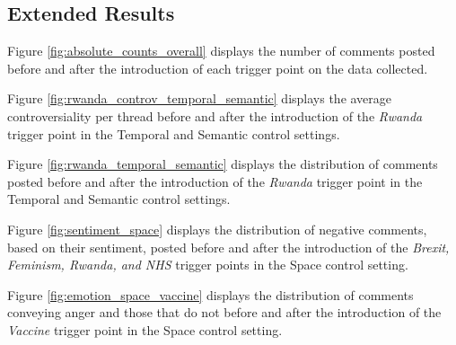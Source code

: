 \subsection{Extended Results}
\label{sec:appendix_counts}

Figure \ref{fig:absolute_counts_overall} displays the number of comments posted before and after the introduction of each trigger point on the data collected.

Figure \ref{fig:rwanda_controv_temporal_semantic} displays the average controversiality per thread before and after the introduction of the \textit{Rwanda} trigger point in the Temporal and Semantic control settings.

Figure \ref{fig:rwanda_temporal_semantic} displays the distribution of comments posted before and after the introduction of the \textit{Rwanda} trigger point in the Temporal and Semantic control settings.

Figure \ref{fig:sentiment_space} displays the distribution of negative comments, based on their sentiment, posted before and after the introduction of the \textit{Brexit, Feminism, Rwanda, and NHS} trigger points in the Space control setting.

Figure \ref{fig:emotion_space_vaccine} displays the distribution of comments conveying anger and those that do not before and after the introduction of the \textit{Vaccine} trigger point in the Space control setting.



